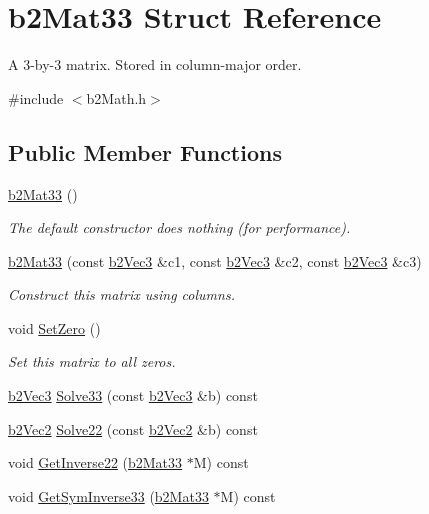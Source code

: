 \hypertarget{structb2_mat33}{}\section{b2\+Mat33 Struct Reference}
\label{structb2_mat33}


A 3-\/by-\/3 matrix. Stored in column-\/major order.  




{\ttfamily \#include $<$b2\+Math.\+h$>$}

\subsection*{Public Member Functions}
\begin{DoxyCompactItemize}
\item 
\hyperlink{structb2_mat33_a1f4d7ddf1c8a202fc08ec64dfe191463}{b2\+Mat33} ()\hypertarget{structb2_mat33_a1f4d7ddf1c8a202fc08ec64dfe191463}{}\label{structb2_mat33_a1f4d7ddf1c8a202fc08ec64dfe191463}

\begin{DoxyCompactList}\small\item\em The default constructor does nothing (for performance). \end{DoxyCompactList}\item 
\hyperlink{structb2_mat33_a36d99a037008776c8d09fe0aeb5c759c}{b2\+Mat33} (const \hyperlink{structb2_vec3}{b2\+Vec3} \&c1, const \hyperlink{structb2_vec3}{b2\+Vec3} \&c2, const \hyperlink{structb2_vec3}{b2\+Vec3} \&c3)\hypertarget{structb2_mat33_a36d99a037008776c8d09fe0aeb5c759c}{}\label{structb2_mat33_a36d99a037008776c8d09fe0aeb5c759c}

\begin{DoxyCompactList}\small\item\em Construct this matrix using columns. \end{DoxyCompactList}\item 
void \hyperlink{structb2_mat33_a42fc6953b025e1c8b59717d0ee7accde}{Set\+Zero} ()\hypertarget{structb2_mat33_a42fc6953b025e1c8b59717d0ee7accde}{}\label{structb2_mat33_a42fc6953b025e1c8b59717d0ee7accde}

\begin{DoxyCompactList}\small\item\em Set this matrix to all zeros. \end{DoxyCompactList}\item 
\hyperlink{structb2_vec3}{b2\+Vec3} \hyperlink{structb2_mat33_a478872c7b6a3bedd13fbedd3ec7a2edb}{Solve33} (const \hyperlink{structb2_vec3}{b2\+Vec3} \&b) const 
\item 
\hyperlink{structb2_vec2}{b2\+Vec2} \hyperlink{structb2_mat33_a2580ac2afadc48028a63ed4c8a1f16bc}{Solve22} (const \hyperlink{structb2_vec2}{b2\+Vec2} \&b) const 
\item 
void \hyperlink{structb2_mat33_a9eb5090b15d08ab495458adfec50e7cb}{Get\+Inverse22} (\hyperlink{structb2_mat33}{b2\+Mat33} $\ast$M) const 
\item 
void \hyperlink{structb2_mat33_a501f85edde8f080e4e9ecff0ec2ee27e}{Get\+Sym\+Inverse33} (\hyperlink{structb2_mat33}{b2\+Mat33} $\ast$M) const 
\end{DoxyCompactItemize}
